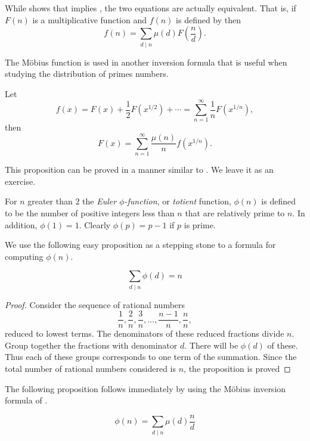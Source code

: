 While  shows that  implies
, the two equations are actually equivalent.
That is, if $F(n)$ is a multiplicative function and $f(n)$ is defined
by  then
\[
f(n) = \sum_{d\mid n} \mu(d) F(\frac{n}{d}).
\]

The M\"obius function is used in another inversion formula that is useful
when studying the distribution of primes numbers.

\begin{proposition}\label{Mobius:Prop:b}
Let 
\[
f(x) = F(x) + \frac{1}{2} F(x^{1/2}) + \cdots = 
\sum_{n=1}^{\infty} \frac{1}{n}F(x^{1/n}),
\]
then 
\[
F(x) = \sum_{n=1}^{\infty}\frac{\mu(n)}{n}f(x^{1/n}).
\]
\end{proposition}

\noindent
This proposition can be proved in a manner similar to
.  We leave it as an exercise.




\medskip
{} 
For $n$ greater than $2$ the {\em Euler $\phi$-function}, or {\em
totient} function, $\phi(n)$ is defined to be the number of positive
integers less than $n$ that are relatively prime to $n$.  In addition,
$\phi(1) = 1$.  Clearly $\phi(p) = p -1$ if $p$ is prime.

We use the following easy proposition as a stepping stone to a formula
for computing $\phi(n)$.

\begin{proposition}
\label{SumTotient:Prop}
\[
\sum_{d\mid n} \phi(d) = n
\]
\end{proposition}

\begin{proof}
Consider the sequence of rational numbers
\[
\frac{1}{n}, \frac{2}{n}, \frac{3}{n}, \ldots,
\frac{n - 1}{n}, \frac{n}{n},
\]
reduced to lowest terms.  The denominators of these reduced fractions
divide $n$.  Group together the fractions with denominator $d$.  There
will be $\phi(d)$ of these.  Thus each of these groups corresponds to
one term of the summation.  Since the total number of rational numbers
considered is $n$, the proposition is proved \end{proof}

The following proposition follows immediately by using the M\"obius
inversion formula of .

\begin{proposition} \label{TotientSum:Prop}
\[
\phi(n) = \sum_{d\mid n} \mu(d) \frac{n}{d}
\]
\end{proposition}

